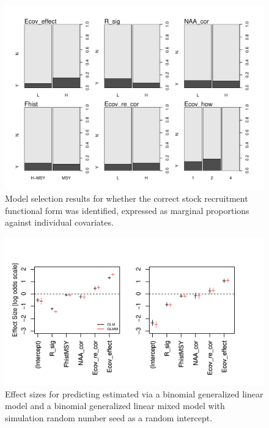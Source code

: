 \documentclass[11pt]{article}
\begin{document}
\begin{figure}[htb]
\begin{center}
\includegraphics[width = 5in]{raw_boxplots_form.pdf}
\caption{Model selection results for whether the correct stock recruitment functional form was identified, expressed as marginal proportions against individual covariates.}
\end{center}
\end{figure}


\begin{figure}[htb]
\begin{center}
\includegraphics[width = 6in]{effect_size_glm_glmm.pdf}
\caption{Effect sizes for predicting estimated via a binomial generalized linear model and a binomial generalized linear mixed model with simulation random number seed as a random intercept.}
\end{center}
\end{figure}
\end{document}
